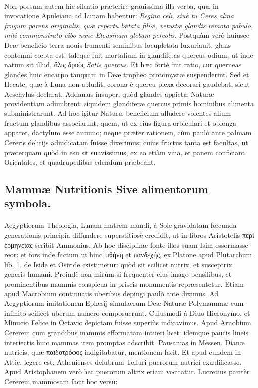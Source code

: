 \documentclass[a4paper, 11pt, oneside, polutonikogreek, latin]{article}
\begin{document}
\paragraph{}
Non possum autem hìc silentio præterire grauissima illa verba, quæ in invocatione Apuleiana ad Lunam habentur: \emph{Regina celi, siuè tu Ceres alma frugum parens originalis, quæ repertu lætata filiæ, vetustæ glandis remoto pabulo, miti commonstrato cibo nunc Eleusinam glebam percolis.} Postquàm verò huiusce Deæ beneficio terra nouis frumenti seminibus locupletata luxuriauit, glans contemni cœpta est: taleque fuit mortalium in glandiferas quercus odium, ut inde natum sit illud, ἅλις δρυὸς \emph{Satis quercus}. Et hæc fortè fuit ratio, cur querneas glandes huic encarpo tanquam in Deæ tropheo protomystæ suspenderint. Sed et Hecate, quæ à Luna non abludit, corona è quercu plexa decorari gaudebat, sicut Aeschylus declarat. Addamus insuper, quòd glandes appictæ Naturæ providentiam adumbrent: siquidem glandiferæ quercus primis hominibus alimenta subministrarunt. Ad hoc igitur Naturæ beneficium alludere volentes alium fructum glandibus associarunt, quem, ut ex eius figura orbiculari et oblonga apparet, dactylum esse autumo; neque præter rationem, cùm paulò ante palmam Cereris delitijs adiudicatam fuisse dixerimus; cuius fructus tanta est facultas, ut præterquam quòd in esu sit suavissimus, ex eo etiàm vina, et panem conficiant Orientales, et quadrupedibus edendum præbeant.
\clearpage
\subsection{Mammæ Nutritionis Sive alimentorum symbola.}
\paragraph{}
Aegyptiorum Theologia, Lunam matrem mundi, à Sole gravidatam fœcunda generationis principia diffundere superstitiosè credidit, ut in libros Aristotelis περὶ ἑρμηνείας scribit Ammonius. Ab hoc disciplinæ fonte illos suam Isim essormasse reor: et fors inde factum ut hinc 	τιθήνη et πανδεχής, ex Platone apud Plutarchum lib. 1. de Iside et Osiride existimetur: quòd sit scilicet nutrix, et susceptrix generis humani. Proindè non mirùm si frequentèr eius imago pensilibus, et prominentibus mammis conspicua in priscis monumentis repræsentetur. Etiam apud Macrobium continuatis uberibus depingi paulò ante diximus. Ad Aegyptiorum imitationem Ephesij simulacrum Deæ Naturæ Polymammæ cum infinito scilicet uberum numero composuerunt. Cuiusmodi à Diuo Hieronymo, et Minucio Felice in Octavio depictam fuisse superiùs indicavimus. Apud Arnobium Cererem cum grandibus mammis efformatam intueri licet: idemque paucis lineis interiectis huic mammas item promptas adscribit. Pausanias in Messen. Dianæ nutricis, quæ παιδοτρόφος indigitabatur, mentionem facit. Et apud eundem in Attic. legere est, Athenienses delubrum Telluri puerorum nutrici exædificasse. Apud Aristophanem verò hec puerorum altrix etiam vocitatur. Lucretius paritèr Cererem mammosam facit hoc versu:
\end{document}
